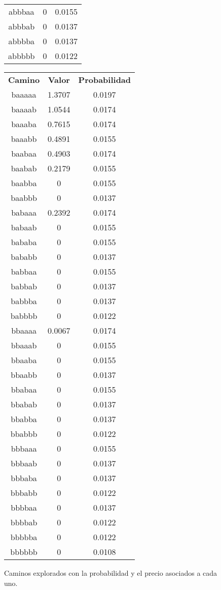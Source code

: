 \begin{figure}[hbpt]
\begin{minipage}{0.48\textwidth}
\begin{center}
\begin{tabular}{|c|c|c|}
abbbaa  & 0 &  0.0155  \\
abbbab  & 0 &  0.0137  \\
abbbba  & 0 &  0.0137  \\
abbbbb  & 0 &  0.0122  \\
\hline
\end{tabular}
\end{center}
\end{minipage}
\begin{minipage}{0.48\textwidth}
\begin{center}
\begin{tabular}{|c|c|c|}
\hline
\textbf{Camino} & \textbf{Valor} & \textbf{Probabilidad} \\
baaaaa  &  1.3707  &  0.0197  \\
baaaab  &  1.0544  &  0.0174  \\
baaaba  &  0.7615  &  0.0174  \\
baaabb  &  0.4891  &  0.0155  \\
baabaa  &  0.4903  &  0.0174  \\
baabab  &  0.2179  &  0.0155  \\
baabba  & 0 &  0.0155  \\
baabbb  & 0 &  0.0137  \\
babaaa  &  0.2392  &  0.0174  \\
babaab  & 0 &  0.0155  \\
bababa  & 0 &  0.0155  \\
bababb  & 0 &  0.0137  \\
babbaa  & 0 &  0.0155  \\
babbab  & 0 &  0.0137  \\
babbba  & 0 &  0.0137  \\
babbbb  & 0 &  0.0122  \\
bbaaaa  &  0.0067  &  0.0174  \\
bbaaab  & 0 &  0.0155  \\
bbaaba  & 0 &  0.0155  \\
bbaabb  & 0 &  0.0137  \\
bbabaa  & 0 &  0.0155  \\
bbabab  & 0 &  0.0137  \\
bbabba  & 0 &  0.0137  \\
bbabbb  & 0 &  0.0122  \\
bbbaaa  & 0 &  0.0155  \\
bbbaab  & 0 &  0.0137  \\
bbbaba  & 0 &  0.0137  \\
bbbabb  & 0 &  0.0122  \\
bbbbaa  & 0 &  0.0137  \\
bbbbab  & 0 &  0.0122  \\
bbbbba  & 0 &  0.0122  \\
bbbbbb  & 0 &  0.0108  \\
\hline
\end{tabular}
\end{center}
\end{minipage}
\caption{Caminos explorados con la probabilidad y el precio asociados a cada uno.}
\label{fig:2_3a}
\end{figure}


